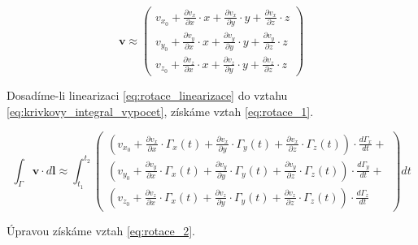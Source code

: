 \documentclass{book}
\newcommand{\vect}[1]{\boldsymbol{#1}}
\begin{document}
\begin{equation}
\label{eq:rotace_linearizace}
\vect{v} \approx \begin{pmatrix}
v_{x_0} + \frac{\partial v_x}{\partial x} \cdot x + \frac{\partial v_x}{\partial y} \cdot y + \frac{\partial v_x}{\partial z} \cdot z \\
v_{y_0} + \frac{\partial v_y}{\partial x} \cdot x + \frac{\partial v_y}{\partial y} \cdot y + \frac{\partial v_y}{\partial z} \cdot z \\
v_{z_0} + \frac{\partial v_z}{\partial x} \cdot x + \frac{\partial v_z}{\partial y} \cdot y + \frac{\partial v_z}{\partial z} \cdot z
\end{pmatrix}
\end{equation}

Dosadíme-li linearizaci \eqref{eq:rotace_linearizace} do vztahu \eqref{eq:krivkovy_integral_vypocet}, získáme vztah \eqref{eq:rotace_1}.

\begin{equation}
\label{eq:rotace_1}
\int_\Gamma \vect{v} \cdot d\vect{l} \approx
\int_{t_1}^{t_2} \begin{pmatrix}
\left(v_{x_0} + \frac{\partial v_x}{\partial x} \cdot \Gamma_x(t) + \frac{\partial v_x}{\partial y} \cdot \Gamma_y(t) + \frac{\partial v_x}{\partial z} \cdot \Gamma_z(t)\right) \cdot \frac{d \Gamma_x}{dt} + \\
\left(v_{y_0} + \frac{\partial v_y}{\partial x} \cdot \Gamma_x(t) + \frac{\partial v_y}{\partial y} \cdot \Gamma_y(t) + \frac{\partial v_y}{\partial z} \cdot \Gamma_z(t)\right) \cdot \frac{d \Gamma_y}{dt} + \\
\left(v_{z_0} + \frac{\partial v_z}{\partial x} \cdot \Gamma_x(t) + \frac{\partial v_z}{\partial y} \cdot \Gamma_y(t) + \frac{\partial v_z}{\partial z} \cdot \Gamma_z(t)\right) \cdot \frac{d \Gamma_z}{dt}
\end{pmatrix} dt
\end{equation}

Úpravou získáme vztah \eqref{eq:rotace_2}.
\end{document}
